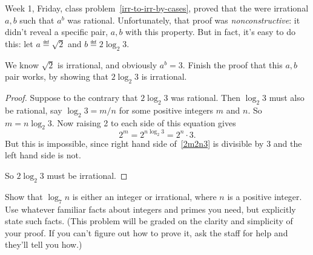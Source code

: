 \documentclass[handout]{mcs}
\begin{document}
\renewcommand{\reading}{Notes Chapters 1--3.}




\begin{problem}
  Week 1, Friday, class problem~\ref{irr-to-irr-by-cases}, proved that the
  were irrational $a,b$ such that $a^b$ was rational.  Unfortunately, that
  proof was \emph{nonconstructive}: it didn't reveal a specific pair,
  $a,b$ with this property.  But in fact, it's easy to do this: let $a
  \eqdef \sqrt{2}$ and $b \eqdef 2\log_2 3$.
  
  We know $\sqrt{2}$ is irrational, and obviously $a^b =3$.  Finish the
  proof that this $a,b$ pair works, by showing that $2\log_2 3$ is
  irrational.

\begin{solution}
\begin{proof}
  Suppose to the contrary that $2\log_2 3$ was rational.  Then $\log_2 3$
  must also be rational, say $\log_2 3 =m/n$ for some positive integers
  $m$ and $n$.  So $m = n\log_2 3$.  Now raising 2 to each side of this
  equation gives
\begin{equation}\label{2m2n3}
2^m = 2^{n \log_2 3} =  2^n\cdot 3.
\end{equation}
But this is impossible, since right hand side of~\eqref{2m2n3} is
divisible by 3 and the left hand side is not.

So $2\log_2 3$ must be irrational.
\end{proof}
\end{solution}
\end{problem}

\iffalse
Show that $\log_{7} n$ is either an integer or irrational, where $n$ is a
positive integer.  Use whatever familiar facts about integers and primes
you need, but explicitly state such facts.  (This problem will be graded
on the clarity and simplicity of your proof.  If you can't figure out how
to prove it, ask the staff for help and they'll tell you how.)
\end{document}
